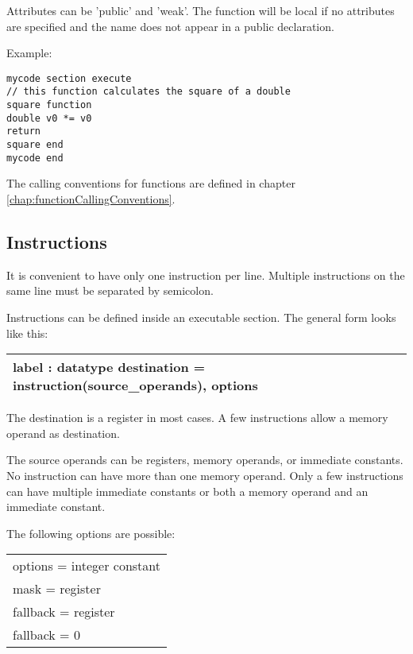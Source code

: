 \documentclass[forwardcom.tex]{subfiles}
\begin{document}
Attributes can be 'public' and 'weak'. The function will be local if no attributes are specified and 
the name does not appear in a public declaration.
\vspace{2mm}

Example:
\vspace{1mm}

\begin{lstlisting}[frame=single]
mycode section execute
// this function calculates the square of a double
square function
double v0 *= v0
return
square end
mycode end
\end{lstlisting}
\vspace{2mm}

The calling conventions for functions are defined in chapter \ref{chap:functionCallingConventions}.
\vspace{2mm}


\subsection{Instructions} \label{assemblyInstructions}
It is convenient to have only one instruction per line. Multiple instructions on the same line must be separated by semicolon.
\vspace{2mm}

Instructions can be defined inside an executable section. The general form looks like this:

\begin{tabular}{|p{130mm}|}
\hline
\hspace{4mm} label : datatype destination = instruction(source\_operands), options \\
\hline
\end{tabular}
\vspace{4mm}

The destination is a register in most cases. A few instructions allow a memory operand as destination.

The source operands can be registers, memory operands, or immediate constants. 
No instruction can have more than one memory operand. Only a few instructions can have multiple immediate constants or both a memory operand and an immediate constant.
\vspace{2mm}

The following options are possible:\\
\begin{tabular}{|p{140mm}|}
\hline
options = integer constant\\
mask = register\\
fallback = register\\
fallback = 0\\
\hline
\end{tabular}
\vspace{2mm}
\end{document}

